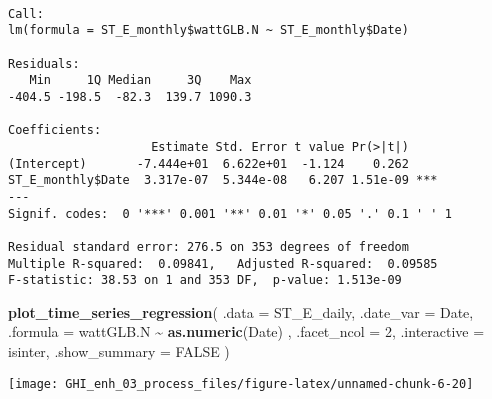\documentclass[
  10pt,
  a4paper,oneside]{article}
\newenvironment{Shaded}{\begin{snugshade}}{\end{snugshade}}
\newcommand{\AttributeTok}[1]{\textcolor[rgb]{0.13,0.29,0.53}{#1}}
\newcommand{\ConstantTok}[1]{\textcolor[rgb]{0.56,0.35,0.01}{#1}}
\newcommand{\DecValTok}[1]{\textcolor[rgb]{0.00,0.00,0.81}{#1}}
\newcommand{\FunctionTok}[1]{\textcolor[rgb]{0.13,0.29,0.53}{\textbf{#1}}}
\newcommand{\NormalTok}[1]{#1}
\newcommand{\OtherTok}[1]{\textcolor[rgb]{0.56,0.35,0.01}{#1}}
\newcommand{\SpecialCharTok}[1]{\textcolor[rgb]{0.81,0.36,0.00}{\textbf{#1}}}
\begin{document}
\begin{Shaded}
\end{Shaded}

\begin{verbatim}

Call:
lm(formula = ST_E_monthly$wattGLB.N ~ ST_E_monthly$Date)

Residuals:
   Min     1Q Median     3Q    Max 
-404.5 -198.5  -82.3  139.7 1090.3 

Coefficients:
                    Estimate Std. Error t value Pr(>|t|)    
(Intercept)       -7.444e+01  6.622e+01  -1.124    0.262    
ST_E_monthly$Date  3.317e-07  5.344e-08   6.207 1.51e-09 ***
---
Signif. codes:  0 '***' 0.001 '**' 0.01 '*' 0.05 '.' 0.1 ' ' 1

Residual standard error: 276.5 on 353 degrees of freedom
Multiple R-squared:  0.09841,   Adjusted R-squared:  0.09585 
F-statistic: 38.53 on 1 and 353 DF,  p-value: 1.513e-09
\end{verbatim}

\begin{Shaded}
\begin{Highlighting}[]
\FunctionTok{plot\_time\_series\_regression}\NormalTok{(}
    \AttributeTok{.data         =}\NormalTok{ ST\_E\_daily,}
    \AttributeTok{.date\_var     =}\NormalTok{ Date,}
    \AttributeTok{.formula      =}\NormalTok{ wattGLB.N }\SpecialCharTok{\textasciitilde{}} \FunctionTok{as.numeric}\NormalTok{(Date)  ,}
    \AttributeTok{.facet\_ncol   =} \DecValTok{2}\NormalTok{,}
    \AttributeTok{.interactive  =}\NormalTok{ isinter,}
    \AttributeTok{.show\_summary =} \ConstantTok{FALSE}
\NormalTok{)}
\end{Highlighting}
\end{Shaded}

\begin{center}\texttt{[image: GHI\_enh\_03\_process\_files/figure-latex/unnamed-chunk-6-20]} \end{center}
\end{document}
